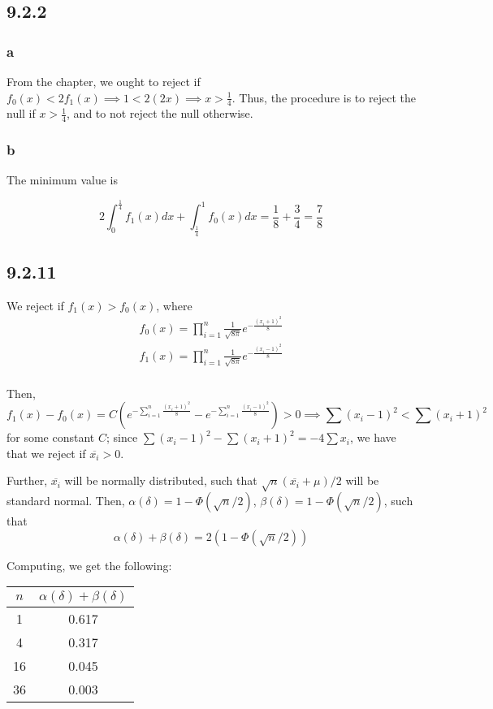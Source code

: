 \documentclass[12pt,letterpaper]{article}
\theoremstyle{definition}
\begin{document}
\subsection*{9.2.2}

\subsubsection*{a}

From the chapter, we ought to reject if $f_0(x) < 2f_1(x) \implies 1 < 2(2x)
\implies x > \frac{1}{4}$. Thus, the procedure is to reject the null if $x >
\frac{1}{4}$, and to not reject the null otherwise.

\subsubsection*{b}

The minimum value is

\[
  2\int_0^{\frac{1}{4}}f_1(x)dx + \int_{\frac{1}{4}}^1f_0(x)dx = \frac{1}{8} +
  \frac{3}{4} = \frac{7}{8}
\]

\subsection*{9.2.11}

We reject if $f_1(x) > f_0(x)$, where
\begin{gather*}
  f_0(x) = \prod_{i=1}^n\frac{1}{\sqrt{8\pi}}e^{-\frac{(x_i+1)^2}{8}} \\
  f_1(x) = \prod_{i=1}^n\frac{1}{\sqrt{8\pi}}e^{-\frac{(x_i-1)^2}{8}} \\
\end{gather*}

Then,
\[
  f_1(x) - f_0(x) = C(e^{-\sum_{i=1}^n\frac{(x_i+1)^2}{8}} -
  e^{-\sum_{i=1}^n\frac{(x_i-1)^2}{8}}) > 0 \implies \sum (x_i-1)^2 < \sum (x_i+1)^2
\]
for some constant $C$; since $\sum (x_i-1)^2 - \sum (x_i+1)^2 = -4\sum x_i$, we
have that we reject if $\overline{x_i} > 0$.

Further, $\overline{x_i}$ will be normally distributed,
such that $\sqrt{n}(\overline{x_i} + \mu)/2$ will be standard normal. Then,
$\alpha(\delta) = 1 - \Phi(\sqrt{n}/2)$, $\beta(\delta) = 1 - \Phi(\sqrt{n}/2)$,
such that
\[
  \alpha(\delta) + \beta(\delta) = 2(1 - \Phi(\sqrt{n}/2))
\]

Computing, we get the following:

\begin{center}
  \begin{tabular}{c|c}
    $n$ & $\alpha(\delta) + \beta(\delta)$ \\
    \hline 
    1 & 0.617 \\
    4 & 0.317 \\
    16 & 0.045 \\
    36 & 0.003
  \end{tabular}
\end{center}
\end{document}
